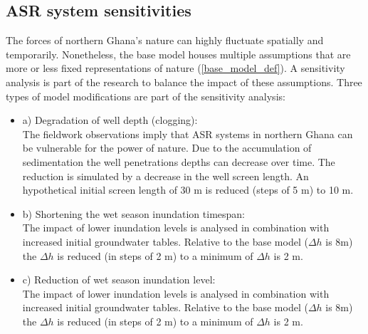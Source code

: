 \subsection{ASR system sensitivities}
\label{subsec:sensitivity}
The forces of northern Ghana's nature can highly fluctuate spatially and temporarily. Nonetheless, the base model houses multiple assumptions that are more or less fixed representations of nature (\ref{base_model_def}). A sensitivity analysis is part of the research to balance the impact of these assumptions. Three types of model modifications are part of the sensitivity analysis: 

\begin{itemize}
\item{a) Degradation of well depth (clogging):} \\
The fieldwork observations imply that ASR systems in northern Ghana can be vulnerable for the power of nature. Due to the accumulation of sedimentation the well penetrations depths can decrease over time. The reduction is simulated by a decrease in the well screen length. An hypothetical initial screen length of 30 m is reduced (steps of 5 m) to 10 m.
\item{b) Shortening the wet season inundation timespan:} \\
The impact of lower inundation levels is analysed in combination with increased initial groundwater tables. Relative to the base model ($\Delta h$ is 8m) the $\Delta h$ is reduced (in steps of 2 m) to a minimum of $\Delta h$ is 2 m.   

\item{c) Reduction of wet season inundation level:} \\
The impact of lower inundation levels is analysed in combination with increased initial groundwater tables. Relative to the base model ($\Delta h$ is 8m) the $\Delta h$ is reduced (in steps of 2 m) to a minimum of $\Delta h$ is 2 m.   
\end{itemize}

